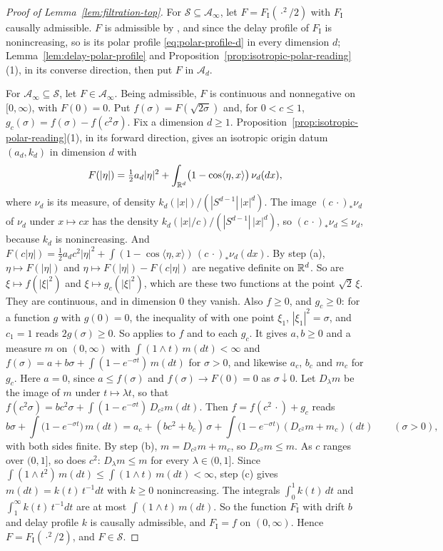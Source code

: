 \begin{proof}[Proof of Lemma~\ref{lem:filtration-top}]
For
$\mathcal{S} \subseteq \mathcal{A}_\infty$, let $F = F_{\mathrm I}(\cdot^2/2)$ with $F_{\mathrm I}$
causally admissible. $F$ is admissible by , and since the delay profile of
$F_{\mathrm I}$ is nonincreasing, so is its polar profile \ref{eq:polar-profile-d} in every
dimension $d$; Lemma~\ref{lem:delay-polar-profile} and Proposition~\ref{prop:isotropic-polar-reading}(1), in its
converse direction, then put $F$ in $\mathcal{A}_d$.

For $\mathcal{A}_\infty \subseteq \mathcal{S}$, let $F \in \mathcal{A}_\infty$. Being admissible,
$F$ is continuous and nonnegative on $[0,\infty)$, with $F(0) = 0$. Put
$f(\sigma) = F(\sqrt{2\sigma})$ and, for $0 < c \le 1$, $g_c(\sigma) = f(\sigma) - f(c^2\sigma)$.
Fix a dimension $d \ge 1$. Proposition~\ref{prop:isotropic-polar-reading}(1), in its forward
direction, gives an isotropic origin datum $(a_d, k_d)$ in dimension $d$ with
\[
  F(|\eta|) = \tfrac12 a_d|\eta|^2 + \int_{\mathbb{R}^d}\bigl(1 - \cos\langle\eta,x\rangle\bigr)\,\nu_d(dx) ,
\]
where $\nu_d$ is its \Levy{} measure, of density $k_d(|x|)/(|S^{d-1}|\,|x|^d)$. The image
$(c\,\cdot)_*\nu_d$ of $\nu_d$ under $x \mapsto cx$ has the density
$k_d(|x|/c)/(|S^{d-1}|\,|x|^d)$, so $(c\,\cdot)_*\nu_d \le \nu_d$, because $k_d$ is nonincreasing.
And $F(c|\eta|) = \tfrac12 a_dc^2|\eta|^2 + \int(1 - \cos\langle\eta,x\rangle)\,(c\,\cdot)_*\nu_d(dx)$.
By step (a), $\eta \mapsto F(|\eta|)$ and $\eta \mapsto F(|\eta|) - F(c|\eta|)$ are negative
definite on $\mathbb{R}^d$. So are $\xi \mapsto f(|\xi|^2)$ and $\xi \mapsto g_c(|\xi|^2)$, which are
these two functions at the point $\sqrt2\,\xi$. They are continuous, and in dimension $0$ they
vanish. Also $f \ge 0$, and $g_c \ge 0$: for a function $g$ with $g(0) = 0$, the inequality of
 with one point $\xi_1$, $|\xi_1|^2 = \sigma$, and $c_1 = 1$ reads $2g(\sigma) \ge 0$.
So  applies to $f$ and to each $g_c$. It gives $a, b \ge 0$ and a measure $m$ on
$(0,\infty)$ with $\int(1 \wedge t)\,m(dt) < \infty$ and
$f(\sigma) = a + b\sigma + \int(1 - e^{-\sigma t})\,m(dt)$ for $\sigma > 0$, and likewise
$a_c$, $b_c$ and $m_c$ for $g_c$. Here $a = 0$, since $a \le f(\sigma)$ and
$f(\sigma) \to F(0) = 0$ as $\sigma \downarrow 0$. Let $D_\lambda m$ be the image of $m$ under
$t \mapsto \lambda t$, so that
$f(c^2\sigma) = bc^2\sigma + \int(1 - e^{-\sigma t})\,D_{c^2}m(dt)$. Then
$f = f(c^2\,\cdot) + g_c$ reads
\[
  b\sigma + \int\bigl(1 - e^{-\sigma t}\bigr)\,m(dt)
  = a_c + (bc^2 + b_c)\,\sigma + \int\bigl(1 - e^{-\sigma t}\bigr)\,(D_{c^2}m + m_c)(dt)
  \qquad (\sigma > 0),
\]
with both sides finite. By step (b), $m = D_{c^2}m + m_c$, so $D_{c^2}m \le m$. As $c$ ranges over
$(0,1]$, so does $c^2$: $D_\lambda m \le m$ for every $\lambda \in (0,1]$. Since
$\int(1 \wedge t^2)\,m(dt) \le \int(1 \wedge t)\,m(dt) < \infty$, step (c) gives
$m(dt) = k(t)\,t^{-1}dt$ with $k \ge 0$ nonincreasing. The integrals $\int_0^1 k(t)\,dt$ and
$\int_1^\infty k(t)\,t^{-1}dt$ are at most $\int(1 \wedge t)\,m(dt)$. So the function
$F_{\mathrm I}$ with drift $b$ and delay profile $k$ is causally admissible, and
$F_{\mathrm I} = f$ on $(0,\infty)$. Hence $F = F_{\mathrm I}(\cdot^2/2)$, and $F \in \mathcal{S}$.


\end{proof}

